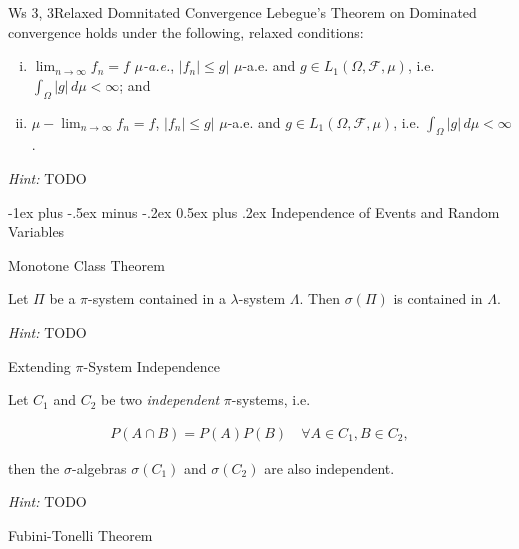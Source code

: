\documentclass[10pt,landscape]{article}
\makeatletter
\renewcommand{\leq}{\leqslant}
\newcommand{\Hint}{\textit{Hint: }}
\newcommand{\SigmaAlgebra}{$\sigma$-algebra}
\newcommand{\CalF}{\mathcal{F}}
\renewcommand{\section}{\@startsection{section}{1}{0mm}%
                                {-1ex plus -.5ex minus -.2ex}%
                                {0.5ex plus .2ex}%
                                {\normalfont\large\bfseries}}
\makeatother
\begin{document}
\begin{multicols}{3}
\begin{exercise}{Ws 3, 3}{Relaxed Domnitated Convergence}
    Lebegue's Theorem on Dominated convergence holds under the following, relaxed conditions:

        \begin{enumerate}[(i)]
            \item $\lim_{n \to \infty} f_n = f$ \emph{$\mu$-a.e.},  $|f_n| \leq g|$ $\mu$-a.e. and $g \in L_1(\Omega, \CalF, \mu)$, i.e. $\int_{\Omega} |g| \, d\mu < \infty$; and
            \item $\mu-\lim_{n \to \infty} f_n = f$,  $|f_n| \leq g|$ $\mu$-a.e. and $g \in L_1(\Omega, \CalF, \mu)$, i.e. $\int_{\Omega} |g| \, d\mu < \infty$.
        \end{enumerate}

    \Hint TODO

\end{exercise}


\section{Independence of Events and Random Variables}

\begin{theorem}{6.3}{Monotone Class Theorem}

    Let $\Pi$ be a $\pi$-system contained in a $\lambda$-system $\Lambda$. Then $\sigma(\Pi)$ is contained in $\Lambda$.

    \Hint TODO

\end{theorem}

\begin{proposition}{6.4}{Extending $\pi$-System Independence}

    Let $C_1$ and $C_2$ be two \emph{independent} $\pi$-systems, i.e.

        \begin{align*}
            P(A \cap B) = P(A)P(B) \quad \forall A \in C_1, B \in C_2,
        \end{align*}

    then the \SigmaAlgebra s $\sigma(C_1)$ and $\sigma(C_2)$ are also independent.

    \Hint TODO

\end{proposition}

\begin{theorem}{6.7}{Fubini-Tonelli Theorem}


\end{theorem}
\end{multicols}
\end{document}
